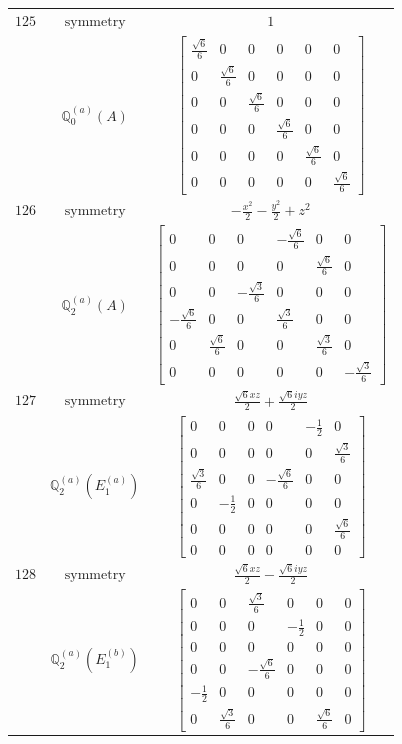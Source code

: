 \documentclass[fleqn,8pt,landscape]{jsarticle}
\begin{document}
\begin{longtable}{ccc}
$ 125 $ & $ \text{symmetry} $ & $ 1 $ \\
$  $ & $ \mathbb{Q}_{0}^{(a)}(A) $ & $ \begin{bmatrix} \frac{\sqrt{6}}{6} & 0 & 0 & 0 & 0 & 0 \\ 0 & \frac{\sqrt{6}}{6} & 0 & 0 & 0 & 0 \\ 0 & 0 & \frac{\sqrt{6}}{6} & 0 & 0 & 0 \\ 0 & 0 & 0 & \frac{\sqrt{6}}{6} & 0 & 0 \\ 0 & 0 & 0 & 0 & \frac{\sqrt{6}}{6} & 0 \\ 0 & 0 & 0 & 0 & 0 & \frac{\sqrt{6}}{6} \end{bmatrix} $ \\ \hline
$ 126 $ & $ \text{symmetry} $ & $ - \frac{x^{2}}{2} - \frac{y^{2}}{2} + z^{2} $ \\
$  $ & $ \mathbb{Q}_{2}^{(a)}(A) $ & $ \begin{bmatrix} 0 & 0 & 0 & - \frac{\sqrt{6}}{6} & 0 & 0 \\ 0 & 0 & 0 & 0 & \frac{\sqrt{6}}{6} & 0 \\ 0 & 0 & - \frac{\sqrt{3}}{6} & 0 & 0 & 0 \\ - \frac{\sqrt{6}}{6} & 0 & 0 & \frac{\sqrt{3}}{6} & 0 & 0 \\ 0 & \frac{\sqrt{6}}{6} & 0 & 0 & \frac{\sqrt{3}}{6} & 0 \\ 0 & 0 & 0 & 0 & 0 & - \frac{\sqrt{3}}{6} \end{bmatrix} $ \\ \hline
$ 127 $ & $ \text{symmetry} $ & $ \frac{\sqrt{6} x z}{2} + \frac{\sqrt{6} i y z}{2} $ \\
$  $ & $ \mathbb{Q}_{2}^{(a)}(E_{1}^{(a)}) $ & $ \begin{bmatrix} 0 & 0 & 0 & 0 & - \frac{1}{2} & 0 \\ 0 & 0 & 0 & 0 & 0 & \frac{\sqrt{3}}{6} \\ \frac{\sqrt{3}}{6} & 0 & 0 & - \frac{\sqrt{6}}{6} & 0 & 0 \\ 0 & - \frac{1}{2} & 0 & 0 & 0 & 0 \\ 0 & 0 & 0 & 0 & 0 & \frac{\sqrt{6}}{6} \\ 0 & 0 & 0 & 0 & 0 & 0 \end{bmatrix} $ \\ \hline
$ 128 $ & $ \text{symmetry} $ & $ \frac{\sqrt{6} x z}{2} - \frac{\sqrt{6} i y z}{2} $ \\
$  $ & $ \mathbb{Q}_{2}^{(a)}(E_{1}^{(b)}) $ & $ \begin{bmatrix} 0 & 0 & \frac{\sqrt{3}}{6} & 0 & 0 & 0 \\ 0 & 0 & 0 & - \frac{1}{2} & 0 & 0 \\ 0 & 0 & 0 & 0 & 0 & 0 \\ 0 & 0 & - \frac{\sqrt{6}}{6} & 0 & 0 & 0 \\ - \frac{1}{2} & 0 & 0 & 0 & 0 & 0 \\ 0 & \frac{\sqrt{3}}{6} & 0 & 0 & \frac{\sqrt{6}}{6} & 0 \end{bmatrix} $ \\ \hline

\end{longtable}
\end{document}

